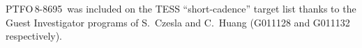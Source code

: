 \documentclass[12pt,twocolumn,tighten]{aastex62}
\newcommand{\ptfo}{PTFO$\,$8-8695}
\begin{document}
\acknowledgements
%
%
%
\ptfo\ was included on the TESS ``short-cadence'' target list thanks to the
Guest Investigator programs of S.\ Czesla and C.\ Huang (G011128 and
G011132 respectively).
%
%
%
%
\end{document}
